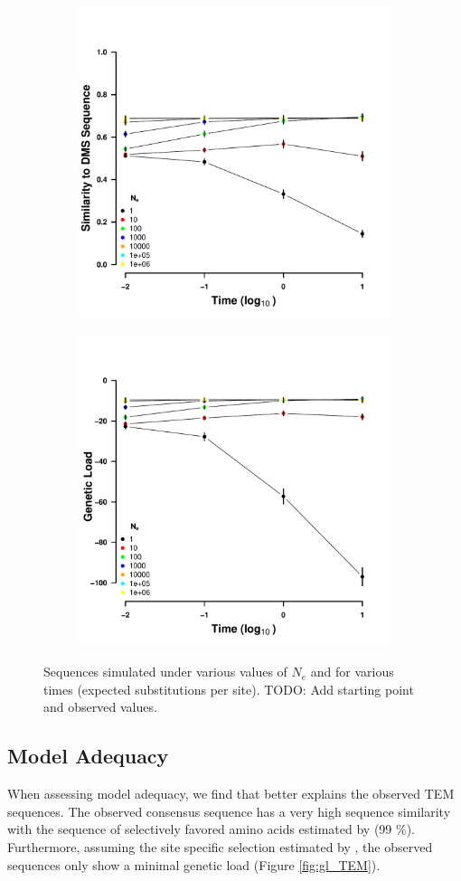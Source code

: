 \documentclass[12pt]{article}
\begin{document}
\begin{figure}[h]
    \centering
    \begin{subfigure}
        \centering
        \includegraphics[width=.45\textwidth]{img/simulated_dist_time.pdf}
    \end{subfigure}
    \begin{subfigure}
        \centering
        \includegraphics[width=.45\textwidth]{img/simulated_gl_time.pdf}
    \end{subfigure}
    \caption{Sequences simulated under various values of $N_e$ and for various times (expected substitutions per site). TODO: Add starting point and observed values.}
    \label{fig:dms_sim}
\end{figure}

\subsection*{\selac Model Adequacy} 
When assessing model adequacy, we find that \selac better explains the observed TEM sequences.
The observed consensus sequence has a very high sequence similarity with the sequence of selectively favored amino acids estimated by \selac (99 \%).
Furthermore, assuming the site specific selection estimated by \selac, the observed sequences only show a minimal genetic load (Figure \ref{fig:gl_TEM}).
\end{document}

